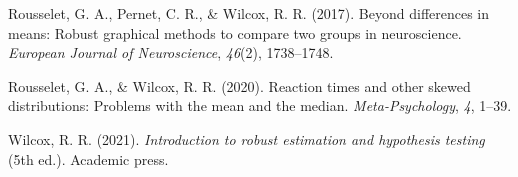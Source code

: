 \documentclass[
  doc, donotrepeattitle,floatsintext]{apa7}
\newlength{\cslhangindent}
\newlength{\cslentryspacingunit} %
\newenvironment{CSLReferences}[2] %
 {%
  \setlength{\parindent}{0pt}
  \ifodd #1
  \let\oldpar\par
  \def\par{\hangindent=\cslhangindent\oldpar}
  \fi
  \setlength{\parskip}{#2\cslentryspacingunit}
 }%
 {}
\begin{document}
\begin{CSLReferences}{1}{0}
\leavevmode{}%
Rousselet, G. A., Pernet, C. R., \& Wilcox, R. R. (2017). Beyond differences in means: Robust graphical methods to compare two groups in neuroscience. \emph{European Journal of Neuroscience}, \emph{46}(2), 1738--1748.

\leavevmode{}%
Rousselet, G. A., \& Wilcox, R. R. (2020). Reaction times and other skewed distributions: Problems with the mean and the median. \emph{Meta-Psychology}, \emph{4}, 1--39.

\leavevmode{}%
Wilcox, R. R. (2021). \emph{Introduction to robust estimation and hypothesis testing} (5th ed.). Academic press.

\end{CSLReferences}
\end{document}
